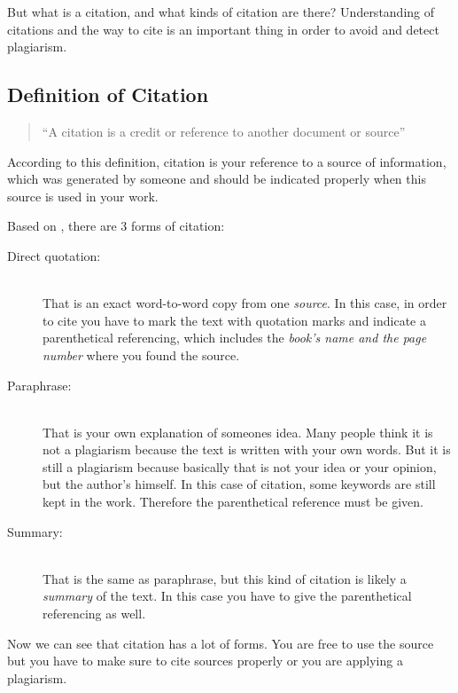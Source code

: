 But what is a citation, and 
what kinds of citation are there? Understanding of citations and the way to cite is an important thing in order to 
avoid and detect plagiarism.

\subsection{Definition of Citation}

\begin{quote}\enquote{A citation is a credit or reference to another document or source}\\ \citep{wiki:Citation}\end{quote}

According to this definition, citation is your reference to a source of information, which was generated by someone 
and should be indicated properly when this source is used in your work.

Based on \citet{Wiredprof2010}, there are 3 forms of citation:

\begin{description}
\item[Direct quotation:] \hfill \\
That is an exact word-to-word copy from one \textit{source}. In this case, in order to cite you have to mark 
the text with quotation marks and indicate a  parenthetical referencing, which includes the \textit{book’s name and the page 
number} where you found the source.
\item[Paraphrase:] \hfill \\
That is your own explanation of someones idea. Many people think it is not a plagiarism because the text 
is written with your own words. But it is still a plagiarism because basically that is not your idea or your opinion, 
but the author’s himself. In this case of citation, some keywords are still kept in the work. Therefore the 
parenthetical reference must be given.
\item[Summary:] \hfill \\
That is the same as paraphrase, but this kind of citation is likely a \textit{summary} of the text. In this case you 
have to give the parenthetical referencing as well.
\end{description}

Now we can see that citation has a lot of forms. You are free to use the source but you have to make sure to cite 
sources properly 
or you are applying a plagiarism.

